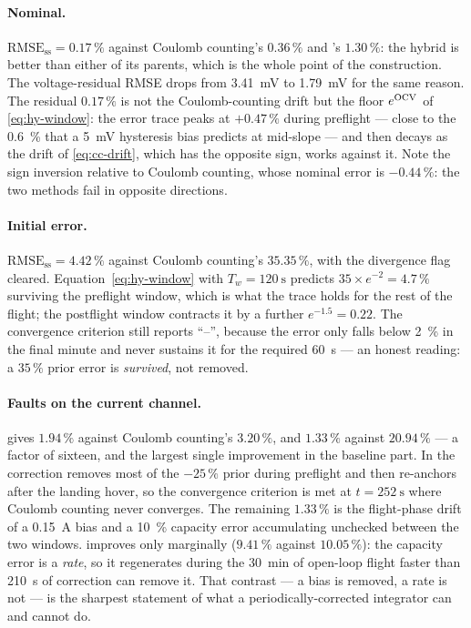 \paragraph{Nominal.} $\text{RMSE}_{\text{ss}} = 0.17\,\%$ against Coulomb counting's $0.36\,\%$ and
's $1.30\,\%$: the hybrid is better than either of its parents, which is the whole
point of the construction. The voltage-residual RMSE drops from \SI{3.41}{\milli\volt} to
\SI{1.79}{\milli\volt} for the same reason. The residual $0.17\,\%$ is not the Coulomb-counting
drift but the floor $e^{\mathrm{OCV}}$ of \eqref{eq:hy-window}: the error trace peaks at $+0.47\,\%$ during
preflight --- close to the \SI{0.6}{\percent} that a \SI{5}{\milli\volt} hysteresis bias predicts at
mid-slope --- and then decays as the drift of \eqref{eq:cc-drift}, which has the opposite sign,
works against it. Note the sign inversion relative to Coulomb counting, whose nominal error is
$-0.44\,\%$: the two methods fail in opposite directions.

\paragraph{Initial error.} $\text{RMSE}_{\text{ss}} = 4.42\,\%$ against Coulomb counting's
$35.35\,\%$, with the divergence flag cleared. Equation~\eqref{eq:hy-window} with
$T_w = \SI{120}{\second}$ predicts $35\times e^{-2} = 4.7\,\%$ surviving the preflight window, which
is what the trace holds for the rest of the flight; the postflight window contracts it by a further
$e^{-1.5} = 0.22$. The convergence criterion still reports ``--'', because the error only falls
below \SI{2}{\percent} in the final minute and never sustains it for the required
\SI{60}{\second} --- an honest reading: a $35\,\%$ prior error is \emph{survived}, not removed.

\paragraph{Faults on the current channel.}  gives $1.94\,\%$ against Coulomb
counting's $3.20\,\%$, and  $1.33\,\%$ against $20.94\,\%$ --- a factor of sixteen,
and the largest single improvement in the baseline part. In  the correction removes
most of the $-25\,\%$ prior during preflight and then re-anchors after the landing hover, so the
convergence criterion is met at $t=\SI{252}{\second}$ where Coulomb counting never converges. The
remaining $1.33\,\%$ is the flight-phase drift of a \SI{0.15}{\ampere} bias and a \SI{10}{\percent}
capacity error accumulating unchecked between the two windows.  improves only
marginally ($9.41\,\%$ against $10.05\,\%$): the capacity error is a \emph{rate}, so it regenerates
during the \SI{30}{\minute} of open-loop flight faster than \SI{210}{\second} of correction can
remove it. That contrast --- a bias is removed, a rate is not --- is the sharpest statement of what
a periodically-corrected integrator can and cannot do.

